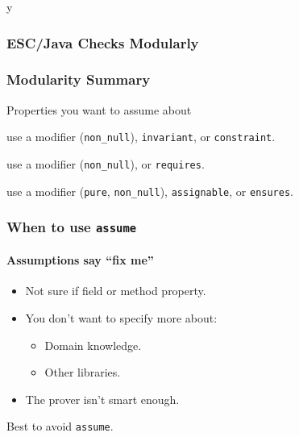 \if y\MAKEHANDOUTS \documentclass[t,compress,landscape,handout]{beamer}
\begin{document}
\begin{frame}[fragile]
\frametitle{ESC/Java Checks Modularly}

\begin{example}

\end{example}
\end{frame}

\begin{frame}[fragile]
\frametitle{Modularity Summary}

Properties you want to assume about
\begin{description}
\item[Fields:]
use a modifier (\lstinline!non_null!),
\lstinline!invariant!, or \lstinline!constraint!.

\item[Method arguments:]
use a modifier (\lstinline!non_null!),
or \lstinline!requires!.

\item[Method results:]
use a modifier (\lstinline!pure!, \lstinline!non_null!),
\lstinline!assignable!, or \lstinline!ensures!.
\end{description}
\end{frame}

\begin{frame}[fragile]
\frametitle{When to use \lstinline!assume!}
\framesubtitle{Assumptions say ``fix me''}

\begin{itemize}
\item
Not sure if field or method property.

\item
You don't want to specify more about:
\begin{itemize}
\item
Domain knowledge.

\item
Other libraries.
\end{itemize}

\item
The prover isn't smart enough.
\end{itemize}

Best to avoid \lstinline!assume!.
\end{frame}
\end{document}
